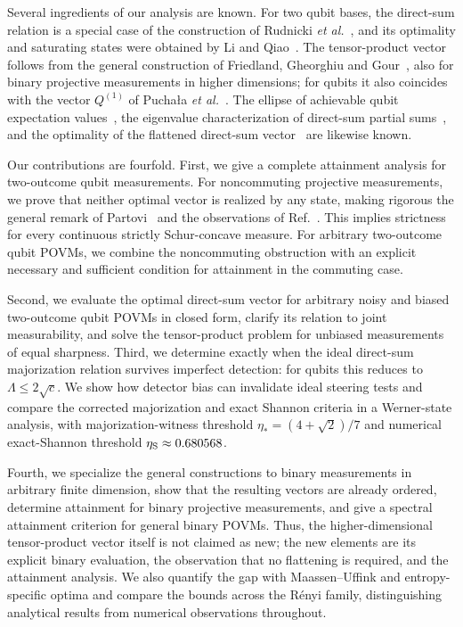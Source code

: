 \documentclass[aps,pra,twocolumn,superscriptaddress,nofootinbib,floatfix]{revtex4-2}
\theoremstyle{definition}
\newcommand{\sqc}{\sqrt{c}}
\begin{document}
Several ingredients of our analysis are known. For two qubit bases, the
direct-sum relation is a special case of the construction of Rudnicki
\emph{et al.}~\cite{RPZ2014}, and its optimality and saturating states were
obtained by Li and Qiao~\cite{LiQiao2019}. The tensor-product vector follows from
the general construction of Friedland, Gheorghiu and Gour~\cite{FGG2013}, also
for binary projective measurements in higher dimensions; for qubits it also
coincides with the vector $Q^{(1)}$ of Pucha{\l}a \emph{et al.}~\cite{PRZ2013}.
The ellipse of achievable qubit expectation
values~\cite{LiQiao2015,KTW2014,Abbott2016}, the eigenvalue characterization of
direct-sum partial sums~\cite{Baek2019}, and the optimality of the flattened
direct-sum vector~\cite{Yuan2023} are likewise known.

Our contributions are fourfold. First, we give a complete attainment analysis for
two-outcome qubit measurements. For noncommuting projective measurements, we
prove that neither optimal vector is realized by any state, making rigorous the
general remark of Partovi~\cite{Partovi2011} and the observations of
Ref.~\cite{LiQiao2018}. This implies strictness for every continuous strictly
Schur-concave measure. For arbitrary two-outcome qubit POVMs, we combine the
noncommuting obstruction with an explicit necessary and sufficient condition for
attainment in the commuting case.

Second, we evaluate the optimal direct-sum vector for arbitrary noisy and biased
two-outcome qubit POVMs in closed form, clarify its relation to joint
measurability, and solve the tensor-product problem for unbiased measurements of
equal sharpness. Third, we determine exactly when the ideal direct-sum
majorization relation survives imperfect detection: for qubits this reduces to
$\Lambda\le2\sqc$. We show how detector bias can invalidate ideal steering tests
and compare the corrected majorization and exact Shannon criteria in a
Werner-state analysis, with majorization-witness threshold
$\eta_*=(4+\sqrt2)/7$ and numerical exact-Shannon threshold
$\eta_{\rm S}\approx0.680568$.

Fourth, we specialize the general constructions to binary measurements in
arbitrary finite dimension, show that the resulting vectors are already ordered,
determine attainment for binary projective measurements, and give a spectral
attainment criterion for general binary POVMs. Thus, the
higher-dimensional tensor-product vector itself is not claimed as new; the new
elements are its explicit binary evaluation, the observation that no flattening
is required, and the attainment analysis. We also quantify the gap with
Maassen--Uffink and entropy-specific optima and compare the bounds across the
R\'enyi family, distinguishing analytical results from numerical observations
throughout.
\end{document}
